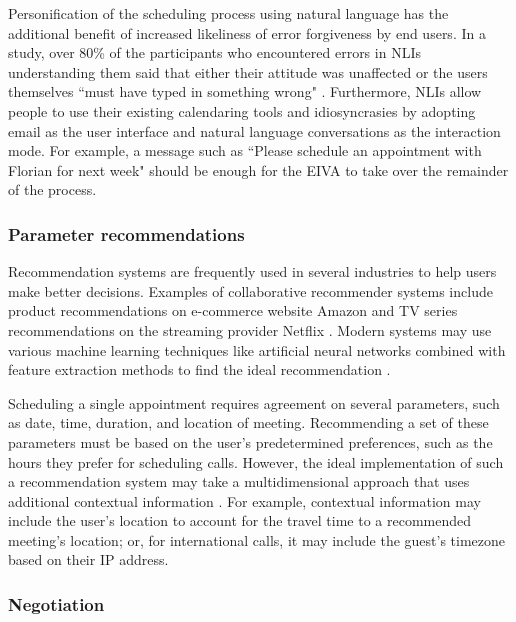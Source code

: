 \documentclass{article}
\begin{document}
Personification of the scheduling process using natural language has the additional benefit of increased likeliness of error forgiveness by end users. In a study, over 80\% of the participants who encountered errors in NLIs understanding them said that either their attitude was unaffected or the users themselves ``must have typed in something wrong" \cite{kelley_iterative_1984}. Furthermore, NLIs allow people to use their existing calendaring tools and idiosyncrasies by adopting email as the user interface and natural language conversations as the interaction mode. For example, a message such as ``Please schedule an appointment with Florian for next week" should be enough for the EIVA to take over the remainder of the process.

\subsubsection{Parameter recommendations}

Recommendation systems are frequently used in several industries to help users make better decisions. Examples of collaborative recommender systems include product recommendations on e-commerce website Amazon \cite{linden_amazoncom_2003} and TV series recommendations on the streaming provider Netflix \cite{gomez-uribe_netflix_2016}. Modern systems may use various machine learning techniques like artificial neural networks combined with feature extraction methods to find the ideal recommendation \cite{adomavicius_toward_2005}.

Scheduling a single appointment requires agreement on several parameters, such as date, time, duration, and location of meeting. Recommending a set of these parameters must be based on the user's predetermined preferences, such as the hours they prefer for scheduling calls. However, the ideal implementation of such a recommendation system may take a multidimensional approach that uses additional contextual information \cite{adomavicius_incorporating_2005}. For example, contextual information may include the user's location to account for the travel time to a recommended meeting's location; or, for international calls, it may include the guest's timezone based on their IP address.

\subsubsection{Negotiation}
\end{document}

